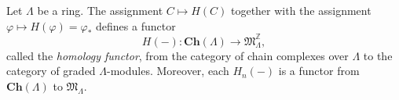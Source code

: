Let $\Lambda$ be a ring. The assignment $C \mapsto H(C)$ together with the assignment $\varphi \mapsto H(\varphi) = \varphi_*$ defines a functor
$$
H(-): \mathbf{Ch}(\Lambda) \longrightarrow \mathfrak{M}_\Lambda^{\mathbb{Z}},
$$
called the \textit{homology functor}, from the category of chain complexes over $\Lambda$ to the category of graded $\Lambda$-modules. Moreover, each $H_n(-)$ is a functor from $\mathbf{Ch}(\Lambda)$ to $\mathfrak{M}_\Lambda$.
